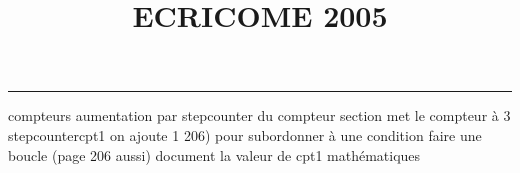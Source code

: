 \documentclass[11pt]{article}%
\title{\bf \vspace{-2cm} ECRICOME 2005} %
\author{} %
\date{} %
\begin{document}
\maketitle %
\vspace{-1.4cm}\hrule %
\thispagestyle{fancy}

\vspace*{.2cm}



compteurs%
aumentation par stepcounter du compteur section%
met le compteur à 3%
stepcounter{cpt1} on ajoute 1%
206) pour subordonner à une condition %
faire une boucle (page 206 aussi) %
document la valeur de cpt1 
mathématiques\newcommand{\ch}{\operatorname{ch}} 
\newcommand{\sh}{\operatorname{sh}}
\renewcommand{\tanh}{\operatorname{th}}
\renewcommand{\sinh}{\operatorname{sh}}
\renewcommand{\cosh}{\operatorname{ch}}
\newcommand{\argsh}{\operatorname{argsh}}
\newcommand{\argch}{\operatorname{argch}}
\newcommand{\argth}{\operatorname{argth}}
\newcommand{\ker}{\operatorname{Ker}}
\renewcommand{\im}{\operatorname{Im}}
\newcommand{\rg}{\operatorname{rg}}
\newcommand{\Id}{\operatorname{Id}}
\renewcommand{\leq}{\leq}
\renewcommand{\geq}{\geq }

\newcommand{\NN}{\mbox{${\mathbb N}$}}
\newcommand{\ZZ}{\mbox{${\mathbb Z}$}}
\newcommand{\QQ}{\mbox{${\mathbb Q}$}}
\newcommand{\RR}{\mbox{${\mathbb R}$}}
\newcommand{\MM}{\mbox{${\mathcal{M}}$}}
\newcommand{\CC}{\mbox{${\mathcal{C}}$}}
\newcommand{\DD}{\mbox{${\mathcal{D}}$}}
\end{document}
